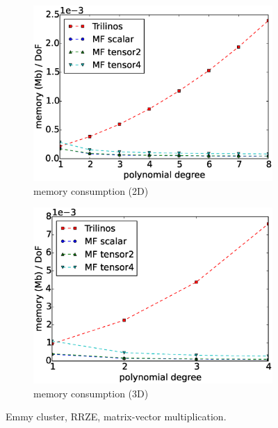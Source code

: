 \documentclass[times,doublespace]{nmeauth}
\begin{document}
\begin{figure}[!ht]
\begin{subfigure}[b]{0.49\textwidth}
      \includegraphics[width=\textwidth]{Emmy_RRZE_memory2d.eps}
      \caption{memory consumption (2D)}
      \label{fig:benchmark_miehe_Emmy_memory2}
  \end{subfigure}
  \begin{subfigure}[b]{0.49\textwidth}
    \centering
    \includegraphics[width=\textwidth]{Emmy_RRZE_memory3d.eps}
    \caption{memory consumption (3D)}
    \label{fig:benchmark_miehe_Emmy_memory3}
  \end{subfigure}
  \caption{Emmy cluster, RRZE, matrix-vector multiplication.}%
  \label{fig:benchmark_miehe_Emmy}
\end{figure}
\end{document}
